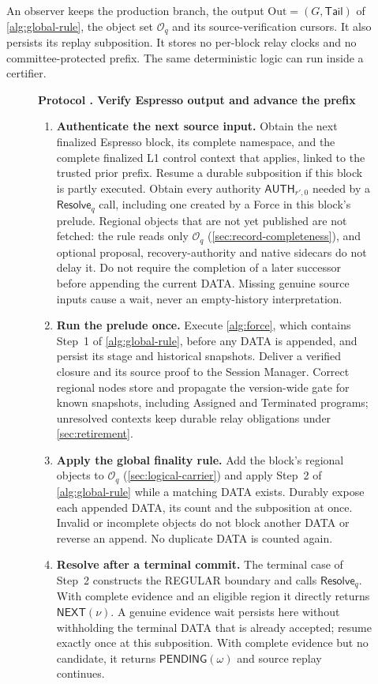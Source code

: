 \documentclass[11pt,a4paper]{article}
\newcommand{\tagg}[1]{\ensuremath{\mathsf{#1}}}
\newcounter{protocol}
\newenvironment{protocol}[3][htbp]{\begin{figure}[#1]\refstepcounter{protocol}\label{#2}
\begin{mdframed}[linewidth=.6pt,skipabove=0pt,skipbelow=0pt,
innertopmargin=7pt,innerbottommargin=7pt]\small
\textbf{Protocol \theprotocol. #3}\par\smallskip}{\end{mdframed}\end{figure}}
\begin{document}
An observer keeps the production branch, the output
$\mathrm{Out}=(G,\mathsf{Tail})$ of \cref{alg:global-rule}, the object
set $\mathcal O_q$ and its source-verification
cursors. It also persists its replay subposition. It stores no per-block
relay clocks and no committee-protected prefix. The same deterministic
logic can run inside a certifier.

\begin{protocol}{alg:external}{Verify Espresso output and advance the prefix}
\begin{enumerate}[label=\textbf{\arabic*)},itemsep=3pt]
\item \textbf{Authenticate the next source input.} Obtain the next
finalized Espresso block, its complete namespace, and the complete
finalized L1 control context that applies, linked to the trusted prior
prefix. Resume a durable subposition if this block is partly executed.
Obtain every authority $\tagg{AUTH}_{r',0}$ needed by a
$\tagg{Resolve}_q$ call, including one created by a Force in this
block's prelude.
Regional objects that are not yet published are not fetched: the rule
reads only $\mathcal O_q$ (\cref{sec:record-completeness}), and optional
proposal, recovery-authority and native sidecars do not delay it. Do not
require the completion of a later successor before appending the
current DATA. Missing genuine source inputs cause a wait, never an
empty-history interpretation.

\item \textbf{Run the prelude once.} Execute \cref{alg:force}, which
contains Step~1 of \cref{alg:global-rule}, before any DATA is appended,
and persist its stage and historical snapshots.
Deliver a verified closure and its source proof to the Session Manager.
Correct regional nodes store and propagate the version-wide gate for
known snapshots, including Assigned and Terminated programs; unresolved
contexts keep durable relay obligations under \cref{sec:retirement}.

\item \textbf{Apply the global finality rule.} Add the block's regional
objects to $\mathcal O_q$ (\cref{sec:logical-carrier}) and apply
Step~2 of \cref{alg:global-rule} while a matching DATA exists.
Durably expose each appended DATA, its count and the subposition at
once. Invalid or incomplete objects do not block another DATA or
reverse an append. No duplicate DATA is counted again.

\item \textbf{Resolve after a terminal commit.} The terminal case of
Step~2 constructs the REGULAR boundary and calls
$\tagg{Resolve}_q$.  With complete evidence and an eligible region it
directly returns $\tagg{NEXT}(\nu)$. A genuine evidence wait persists
here without withholding the terminal DATA that is already accepted;
resume exactly once at this subposition. With complete evidence but no
candidate, it returns $\tagg{PENDING}(\omega)$ and source replay
continues.


\end{enumerate}
\end{protocol}
\end{document}

